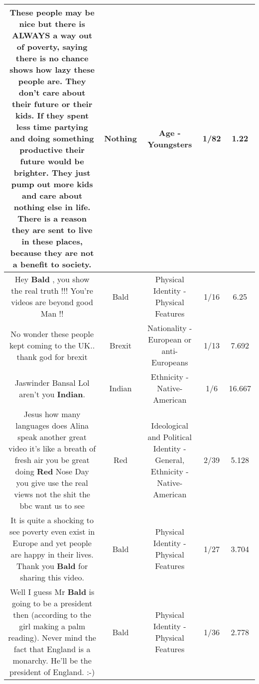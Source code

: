 \documentclass[11pt]{article}
\newlength\mylength
\begin{document}
\begin{center}
\begin{longtable}{|C{.65\mylength}|C{.30\mylength}|C{.12\mylength}|C{.12\mylength}|C{.12\mylength}|}
  \small These people may be nice but there is ALWAYS a way out of poverty, saying there is no chance shows how lazy these people are. They don't care about their future or their kids. If they spent less time partying and doing something productive their future would be brighter. They just pump out more kids and care about \textbf{nothing} else in life. There is a reason they are sent to live in these places, because they are not a benefit to society.\normalsize   & Nothing & Age - Youngsters & 1/82 & 1.22 \\  \hline
  \small Hey \textbf{Bald} , you show the real truth !!! You're videos are beyond good Man !!\normalsize   & Bald & Physical Identity - Physical Features & 1/16 & 6.25 \\  \hline
  \small No wonder these people kept coming to the UK.. thank god for brexit\normalsize   & Brexit & Nationality - European or anti-Europeans & 1/13 & 7.692 \\  \hline
  \small Jaswinder Bansal Lol aren't you \textbf{Indian}.\normalsize   & Indian & Ethnicity - Native-American & 1/6 & 16.667 \\  \hline
  \small Jesus how many languages does Alina speak another great video it's like a breath of fresh air you be great doing \textbf{R\textbf{ed}} Nose Day you give use the real views not the shit the bbc want us to see\normalsize   & Red &  Ideological and Political Identity - General, Ethnicity - Native-American & 2/39 & 5.128 \\  \hline
  \small It is quite a shocking to see poverty even exist in Europe and yet people are happy in their lives. Thank you \textbf{Bald} for sharing this video.\normalsize   & Bald & Physical Identity - Physical Features & 1/27 & 3.704 \\  \hline
  \small Well I guess Mr \textbf{Bald} is going to be a president then (according to the girl making a palm reading). Never mind the fact that England is a monarchy. He'll be the president of England. :-)\normalsize   & Bald & Physical Identity - Physical Features & 1/36 & 2.778 \\  \hline

\end{longtable}
\end{center}
\end{document}
